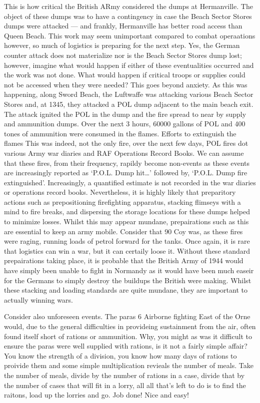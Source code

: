 \documentclass[noraggedright]{turabian-researchpaper}
\begin{document}
This is
how critical the British ARmy considered the dumps at Hermanville.  The 
object of these dumps was to have a contingency in case the Beach Sector 
Stores dumps were attacked --- and frankly, Hermanville has better road access
 than Queen Beach.  This work may seem unimportant compared to combat 
operaations however, so much of logistics is preparing for the next step. 
Yes, the German counter attack does not materialize nor is the Beach Sector
Stores dump lost; however, imagine what would happen if either of these 
eventualities occurred and the work was not done.  What would happen if 
critical troops or supplies could not be accessed when they were needed?  
This goes beyond anxiety.  As this was happening, along Sword Beach, the 
Luftwaffe was attacking various Beach Sector Stores and, at 1345, they attacked
a POL dump adjacent to the main beach exit.  The attack ignited the POL in the
dump and the fire spread to near by supply and ammunition dumps.  Over the next 
3 hours, 60000 gallons of POL and 400 tones of ammunition were consumed in 
the flames.\autocite[8 June 1944]{1raf}  Efforts to extinguish the flames 
This was indeed, not the only fire, over the next few days, POL fires dot 
various Army war diaries and RAF Operations Record Books.  We can assume that
these fires, from their frequency, rapildy become non-events as these events
are increasingly reported as `P.O.L. Dump hit\ldots' followed by, `P.O.L. 
Dump fire extinguished'.\autocite[10 June 1944]{1raf}  Increasingly, a 
quantified estimate is not recorded in the war diaries or operations record
books.  Nevertheless, it is highly likely that preparitory actions such as
prepositioning firefighting apparatus, stacking flimseys with a mind to fire
breaks, and dispersing the storage locations for these dumps helped to minimize
losses.  Whilst this may appear mundane, prepairations such as this are 
essential to keep an army mobile.  Consider that 90 Coy was, as these fires
were raging, running loads of petrol forward for the tanks.  Once again, it is
rare that logistics can win a war, but it can certaily loose it.  Without 
these standard prepairations taking place, it is probable that the British 
Army of 1944 would have simply been unable to fight in Normandy as it would
have been much easeir for the Germans to simply destroy the buildups the 
British were making.  Whilst these stacking and loading standards are quite 
mundane, they are important to actually winning wars.

Consider also unforeseen events.  The paras 6 Airborne fighting East of the 
Orne would, due to the general difficulties in provideing sustainment from 
the air, often found itself short of rations or ammunition.  Why, you might as
was it difficult to ensure the paras were well supplied with rations, is it 
not a fairly simple affair?  You know the strength of a division, you know how
many days of rations to proivide them and some simple multiplication revieals
the number of meals.  Take the number of meals, divide by the number of 
rations in a case, divide that by the number of cases that will fit in a 
lorry, all all that's left to do is to find the raitons, load up the lorries 
and go.  Job done!  Nice and easy!
\end{document}
